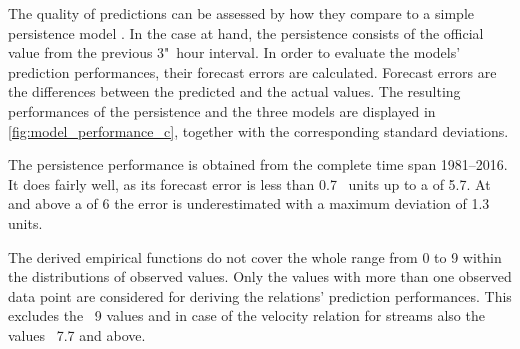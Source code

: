 The quality of predictions can be assessed by how they compare to a simple persistence model \citep{Detman1999}. In the case at hand, the persistence consists of the official \Kp{} value from the previous 3"~hour interval.
In order to evaluate the models' prediction performances, their forecast errors are calculated. Forecast errors are the differences between the predicted and the actual values. The resulting performances of the persistence and the three models are displayed in \autoref{fig:model_performance_c}, together with the corresponding standard deviations.
\begin{figure}
\end{figure}
The persistence performance is obtained from the complete \Kp{} time span 1981--2016. It does fairly well, as its forecast error is less than 0.7~\Kp{} units up to a \Kp{} of 5.7. At and above a \Kp{} of 6 the error is underestimated with a maximum deviation of 1.3~\Kp{} units.

The derived empirical functions do not cover the whole \Kp{} range from 0 to 9 within the distributions of observed values. Only the \Kp{} values with more than one observed data point are considered for deriving the relations' prediction performances. This excludes the \Kp{}~9 values and in case of the velocity relation for streams also the values \Kp{}~7.7 and above.

